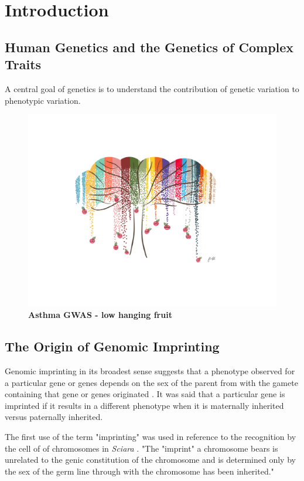 \chapter{Introduction}

\section{Human Genetics and the Genetics of Complex Traits}

A central goal of genetics is to understand the contribution of genetic variation to phenotypic variation.


\begin{figure}
\centering
\includegraphics[width=5in]{img/ch01/fig-01-lowhangingfruit.pdf}
\caption[Low Hanging Fruit.]{\textbf{Asthma GWAS - low hanging fruit}}
\label{fig:lowhangingfruit}
\end{figure}


\section{The Origin of Genomic Imprinting }

Genomic imprinting in its broadest sense suggests that a phenotype observed for a particular gene or genes depends on the sex of the parent from with the gamete containing that gene or genes originated \cite{Sapienza:1989vm}. It was said that a particular gene is imprinted if it results in a different phenotype when it is maternally inherited versus paternally inherited.

The first use of the term "imprinting" was used in reference to the recognition by the cell of of chromosomes in \textit{Sciara} \cite{Crouse:1960vc,Sapienza:1989vm}. "The "imprint" a chromosome bears is unrelated to the genic constitution of the chromosome and is determined only by the sex of the germ line through with the chromosome has been inherited." \cite{Crouse:1960vc} 

